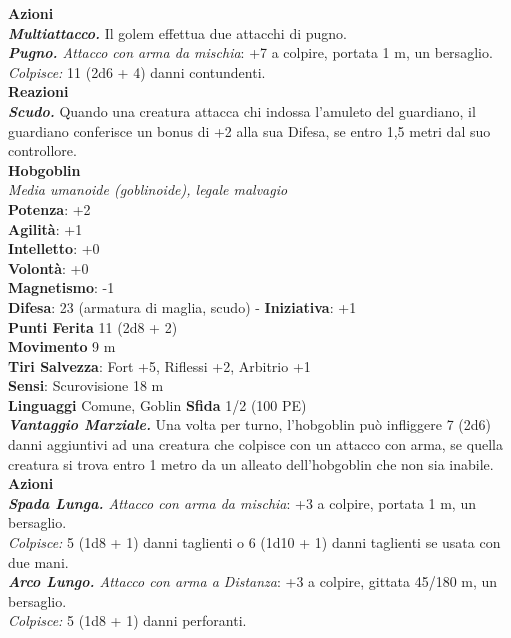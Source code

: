 \begin{multicols}{2}
\smallskip\textbf{Azioni}\\
\emph{\textbf{Multiattacco.}} Il golem effettua due attacchi di pugno.\\
\emph{\textbf{Pugno.} Attacco con arma da mischia}: +7 a colpire, portata 1 m, un bersaglio.\\
\emph{Colpisce:} 11 (2d6 + 4) danni contundenti.\\
\textbf{Reazioni}\\
\emph{\textbf{Scudo.}} Quando una creatura attacca chi indossa l'amuleto del guardiano, il guardiano conferisce un bonus di +2 alla sua Difesa, se entro 1,5 metri dal suo controllore.\\

\medskip\textbf{Hobgoblin}\\
\emph{Media umanoide (goblinoide), legale malvagio}\\
\textbf{Potenza}: +2\\
\textbf{Agilità}: +1\\
\textbf{Intelletto}: +0\\
\textbf{Volontà}: +0\\
\textbf{Magnetismo}: -1\\
\textbf{Difesa}: 23 (armatura di maglia, scudo) - \textbf{Iniziativa}: +1\\
\textbf{Punti Ferita} 11 (2d8 + 2)\\
\textbf{Movimento} 9 m\\
\textbf{Tiri Salvezza}: Fort +5, Riflessi +2, Arbitrio +1\\
\textbf{Sensi}: Scurovisione 18 m\\
\textbf{Linguaggi} Comune, Goblin \textbf{Sfida} 1/2 (100 PE)\smallskip\\
\emph{\textbf{Vantaggio Marziale.}} Una volta per turno, l'hobgoblin può infliggere 7 (2d6) danni aggiuntivi ad una creatura che colpisce con un attacco con arma, se quella creatura si trova entro 1 metro da un alleato dell'hobgoblin che non sia inabile.\\
\smallskip\textbf{Azioni}\\
\emph{\textbf{Spada Lunga.} Attacco con arma da mischia}: +3 a colpire, portata 1 m, un bersaglio.\\
\emph{Colpisce:} 5 (1d8 + 1) danni taglienti o 6 (1d10 + 1) danni taglienti se usata con due mani.\\
\emph{\textbf{Arco Lungo.} Attacco con arma a Distanza}: +3 a colpire, gittata 45/180 m, un bersaglio.\\
\emph{Colpisce:} 5 (1d8 + 1) danni perforanti.\\

\end{multicols}
